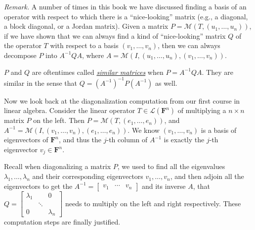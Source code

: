 \documentclass[11pt]{article}
\newcommand{\rmk}{\noindent\textit{Remark. }}
\newcommand{\df}[1]{\ul{\textit{\textsf{#1}}}}
\newcommand{\F}{\mathbf{F}}
\newcommand{\M}{\mathcal{M}}
\begin{document}
    \rmk A number of times in this book we have discussed finding a basis of an operator with respect to which there is a ``nice-looking'' matrix (e.g., a diagonal, a block diagonal, or a Jordan matrix). Given a matrix $P = \M(T,(u_1,\dots,u_n))$, if we have shown that we can always find a kind of ``nice-looking'' matrix $Q$ of the operator $T$ with respect to a basis $(v_1,\dots,v_n)$, then we can always decompose $P$ into $A^{-1}QA$, where $A = \M(I,(u_1,\dots,u_n),(v_1,\dots,v_n))$.

    $P$ and $Q$ are oftentimes called \df{similar matrices} when $P = A^{-1} Q A$. They are similar in the sense that $Q = (A^{-1})^{-1} P (A^{-1})$ as well.

    Now we look back at the diagonalization computation from our first course in linear algebra. Consider the linear operator $T \in \mathcal{L}(\F^n)$ of multiplying a $n\times n$ matrix $P$ on the left. Then $P = \M(T,(e_1,\dots,e_n))$, and $A^{-1} = \M(I,(v_1,\dots,v_n),(e_1,\dots,e_n))$. We know $(v_1,\dots,v_n)$ is a basis of eigenvectors of $\F^n$, and thus the $j$-th column of $A^{-1}$ is exactly the $j$-th eigenvector $v_j \in \F^n$.
    
    Recall when diagonalizing a matrix $P$, we used to find all the eigenvalues $\lambda_1,\dots,\lambda_n$ and their corresponding eigenvectors $v_1,\dots,v_n$, and then adjoin all the eigenvectors to get the $A^{-1} = \begin{bmatrix} v_1 & \cdots & v_n \end{bmatrix}$ and its inverse $A$, that $Q = \begin{bmatrix}
    \lambda_1 & & 0 \\
    & \ddots & \\
    0 & & \lambda_n
    \end{bmatrix}$ needs to multiply on the left and right respectively. These computation steps are finally justified.
\end{document}

